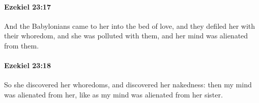 		\paragraph{Ezekiel 23:17} %
			\label{EZEKIEL-23-17}

			And the Babylonians came to her into the bed of love, and they defiled her with their whoredom, and she was polluted with them, and her mind was alienated from them.


		\paragraph{Ezekiel 23:18} %
			\label{EZEKIEL-23-18}

			So she discovered her whoredoms, and discovered her nakedness: then my mind was alienated from her, like as my mind was alienated from her sister.


